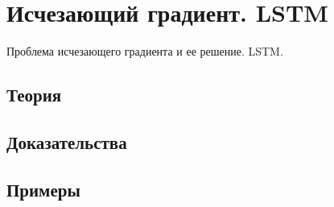 
\section{Исчезающий градиент. LSTM}
\label{sec:1.4.12-vanishing-gradient-lstm}

\begin{ticket}
Проблема исчезающего градиента и ее решение. LSTM.
\end{ticket}

\subsection*{Теория}

\subsection*{Доказательства}

\subsection*{Примеры}
